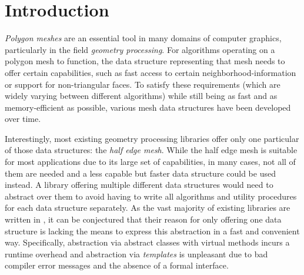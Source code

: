 \chapter{Introduction}



\emph{Polygon meshes} are an essential tool in many domains of computer graphics, particularly in the field \emph{geometry processing}.
For algorithms operating on a polygon mesh to function, the data structure representing that mesh needs to offer certain capabilities, such as fast access to certain neighborhood-information or support for non-triangular faces.
To satisfy these requirements (which are widely varying between different algorithms) while still being as fast and as memory-efficient as possible, various mesh data structures have been developed over time.

Interestingly, most existing geometry processing libraries offer only one particular of those data structures: the \emph{half edge mesh}.
While the half edge mesh is suitable for most applications due to its large set of capabilities, in many cases, not all of them are needed and a less capable but faster data structure could be used instead.
A library offering multiple different data structures would need to abstract over them to avoid having to write all algorithms and utility procedures for each data structure separately.
As the vast majority of existing libraries are written in \cpp, it can be conjectured that their reason for only offering one data structure is \cpp lacking the means to express this abstraction in a fast and convenient way.
Specifically, abstraction via abstract classes with virtual methods incurs a runtime overhead and abstraction via \emph{\cpp templates} is unpleasant due to bad compiler error messages and the absence of a formal interface.

